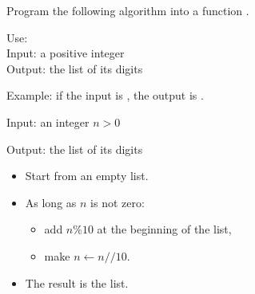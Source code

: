 \documentclass[11pt,class=report,crop=false]{standalone}
\begin{document}


\begin{activite}


Program the following algorithm into a function .

 
   \begin{fonction}
  Use:  \\
  Input: a positive integer \\
  Output: the list of its digits
  
  \medskip
    
  Example: if the input is , the output is \ci{[1,2,3,4]}.
  \end{fonction}


  \begin{algorithme}
  Input: an integer $n>0$

  Output: the list of its digits 

  \begin{itemize}
    \item Start from an empty list.
    
    \item As long as $n$ is not zero:
    
     \begin{itemize} 
       \item add $n \% 10$ at the beginning of the list,
       \item make $n \leftarrow n//10$.
     \end{itemize}    
         
    \item The result is the list.
  \end{itemize} 
             
 \end{algorithme}
 
  

\end{activite}
\end{document}
